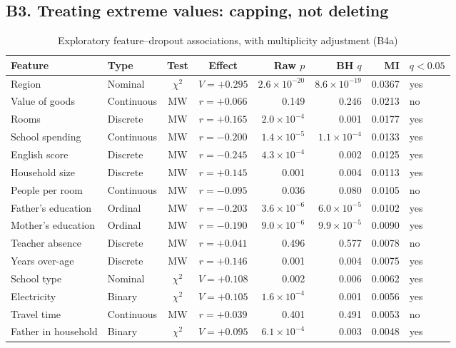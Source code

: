 \documentclass[conference,a4paper]{IEEEtran}
\renewcommand{\arraystretch}{1.12}
\begin{document}
\subsection*{B3. Treating extreme values: capping, not deleting}
\begin{table}[!t]
\centering
\caption{Exploratory feature--dropout associations, with multiplicity adjustment (B4a)}
\label{tab:b4a}
\footnotesize
\setlength{\tabcolsep}{4pt}
\renewcommand{\arraystretch}{1.0}
\begin{tabularx}{\textwidth}{P{3.1cm} P{1.6cm} c c r r r L}
\toprule
Feature & Type & Test & Effect & Raw $p$ & BH $q$ & MI & $q<0.05$ \\
\midrule
Region & Nominal & $\chi^2$ & $V=+0.295$ & $2.6\times10^{-20}$ & $8.6\times10^{-19}$ & 0.0367 & yes \\
Value of goods & Continuous & MW & $r=+0.066$ & 0.149 & 0.246 & 0.0213 & no \\
Rooms & Discrete & MW & $r=+0.165$ & $2.0\times10^{-4}$ & 0.001 & 0.0177 & yes \\
School spending & Continuous & MW & $r=-0.200$ & $1.4\times10^{-5}$ & $1.1\times10^{-4}$ & 0.0133 & yes \\
English score & Discrete & MW & $r=-0.245$ & $4.3\times10^{-4}$ & 0.002 & 0.0125 & yes \\
Household size & Discrete & MW & $r=+0.145$ & 0.001 & 0.004 & 0.0113 & yes \\
People per room & Continuous & MW & $r=-0.095$ & 0.036 & 0.080 & 0.0105 & no \\
Father's education & Ordinal & MW & $r=-0.203$ & $3.6\times10^{-6}$ & $6.0\times10^{-5}$ & 0.0102 & yes \\
Mother's education & Ordinal & MW & $r=-0.190$ & $9.0\times10^{-6}$ & $9.9\times10^{-5}$ & 0.0090 & yes \\
Teacher absence & Discrete & MW & $r=+0.041$ & 0.496 & 0.577 & 0.0078 & no \\
Years over-age & Discrete & MW & $r=+0.146$ & 0.001 & 0.004 & 0.0075 & yes \\
School type & Nominal & $\chi^2$ & $V=+0.108$ & 0.002 & 0.006 & 0.0062 & yes \\
Electricity & Binary & $\chi^2$ & $V=+0.105$ & $1.6\times10^{-4}$ & 0.001 & 0.0056 & yes \\
Travel time & Continuous & MW & $r=+0.039$ & 0.401 & 0.491 & 0.0053 & no \\
Father in household & Binary & $\chi^2$ & $V=+0.095$ & $6.1\times10^{-4}$ & 0.003 & 0.0048 & yes \\

\end{tabularx}
\end{table}
\end{document}
